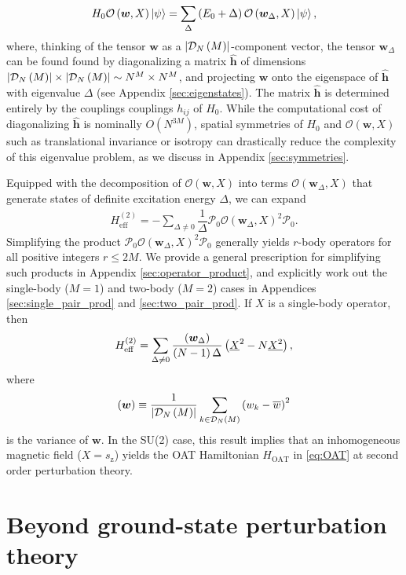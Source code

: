 \documentclass[nofootinbib,notitlepage,11pt]{revtex4-2}
\renewcommand{\t}{\text} %
\newcommand{\f}[2]{\dfrac{#1}{#2}} %
\newcommand{\p}[1]{\left(#1\right)} %
\newcommand{\m}{\bm} %
\newcommand{\1}{\mathds{1}}
\newcommand{\z}{\text{z}}
\newcommand{\D}{\mathcal{D}}
\renewcommand{\O}{\mathcal{O}}
\renewcommand{\P}{\mathcal{P}}
\let\var\relax
\DeclareMathOperator{\var}{var}
\newcommand{\col}{\underline}
\newcommand{\mean}{\overline}
\begin{document}
\begin{align}
  H_0 \O\p{\m w,X} \ket\psi
  = \sum_\Delta \p{E_0+\Delta} \O\p{\m w_\Delta,X} \ket\psi,
\end{align}
where, thinking of the tensor $\m w$ as a $\abs{\D_N\p{M}}$-component
vector, the tensor $\m w_\Delta$ can be found found by diagonalizing a
matrix $\hat{\m h}$ of dimensions
$\abs{\D_N\p{M}}\times\abs{\D_N\p{M}}\sim N^M\times N^M$, and
projecting $\m w$ onto the eigenspace of $\hat{\m h}$ with eigenvalue
$\Delta$ (see Appendix \ref{sec:eigenstates}).  The matrix
$\hat{\m h}$ is determined entirely by the couplings couplings
$h_{ij}$ of $H_0$.  While the computational cost of diagonalizing
$\hat{\m h}$ is nominally $O\p{N^{3M}}$, spatial symmetries of $H_0$
and $\O\p{\m w,X}$ such as translational invariance or isotropy can
drastically reduce the complexity of this eigenvalue problem, as we
discuss in Appendix \ref{sec:symmetries}.

Equipped with the decomposition of $\O\p{\m w,X}$ into terms
$\O\p{\m w_\Delta,X}$ that generate states of definite excitation
energy $\Delta$, we can expand
\begin{align}
  H_{\t{eff}}^{(2)} = -\sum_{\Delta\ne0} \f1\Delta
  \P_0 \O\p{\m w_\Delta,X}^2 \P_0.
\end{align}
Simplifying the product $\P_0 \O\p{\m w_\Delta,X}^2 \P_0$ generally
yields $r$-body operators for all positive integers $r\le2M$.  We
provide a general prescription for simplifying such products in
Appendix \ref{sec:operator_product}, and explicitly work out the
single-body ($M=1$) and two-body ($M=2$) cases in Appendices
\ref{sec:single_pair_prod} and \ref{sec:two_pair_prod}.  If $X$ is a
single-body operator, then
\begin{align}
  H_{\t{eff}}^{(2)}
  = \sum_{\Delta\ne0} \f{\var\p{\m w_\Delta}}{\p{N-1}\Delta}
  \p{\col{X}^2 - N \col{X^2}},
  \label{eq:H_eff_2_1}
\end{align}
where
\begin{align}
  \var\p{\m w} \equiv \f1{\abs{\D_N\p{M}}}
  \sum_{k\in\D_N\p{M}} \p{w_k - \mean w}^2
\end{align}
is the variance of $\m w$.  In the SU(2) case, this result implies
that an inhomogeneous magnetic field ($X=s_\z$) yields the OAT
Hamiltonian $H_{\t{OAT}}$ in \eqref{eq:OAT} at second order
perturbation theory.

\newpage

\section{Beyond ground-state perturbation theory}
\label{sec:shell_model}
\end{document}

